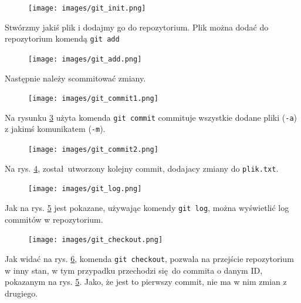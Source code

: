 \begin{figure}[H]
	\centering
	\texttt{[image: images/git\_init.png]}
	\caption{}
	\label{fig:git_init}
\end{figure}

Stwórzmy jakiś plik i dodajmy go do repozytorium. Plik można dodać do repozytorium komendą \texttt{git add}

\begin{figure}[H]
	\centering
	\texttt{[image: images/git\_add.png]}
	\caption{}
	\label{fig:git_add}
\end{figure}

Następnie należy scommitować zmiany. 

\begin{figure}[H]
	\centering
	\texttt{[image: images/git\_commit1.png]}
	\caption{}
	\label{fig:git_commit1}
\end{figure}

Na rysunku \ref{fig:git_commit1} użyta komenda \texttt{git commit} commituje wszystkie dodane pliki (\texttt{-a}) z jakimś komunikatem (\texttt{-m}).  

\begin{figure}[H]
	\centering
	\texttt{[image: images/git\_commit2.png]}
	\caption{}
	\label{fig:git_commit2}
\end{figure}

Na rys. \ref{fig:git_commit2}, został utworzony kolejny commit, dodajacy zmiany do \texttt{plik.txt}.

\begin{figure}[H]
	\centering
	\texttt{[image: images/git\_log.png]}
	\caption{}
	\label{fig:git_log}
\end{figure}

Jak na rys. \ref{fig:git_log} jest pokazane, używając komendy \texttt{git log}, można wyświetlić log commitów w repozytorium.

\begin{figure}[H]
	\centering
	\texttt{[image: images/git\_checkout.png]}
	\caption{}
	\label{fig:git_checkout}
\end{figure}

Jak widać na rys. \ref{fig:git_checkout}, komenda \texttt{git checkout}, pozwala na przejście repozytorium w inny stan, w tym przypadku przechodzi się do commita o danym ID, pokazanym na rys. \ref{fig:git_log}. Jako, że jest to pierwszy commit, nie ma w nim zmian z drugiego.

